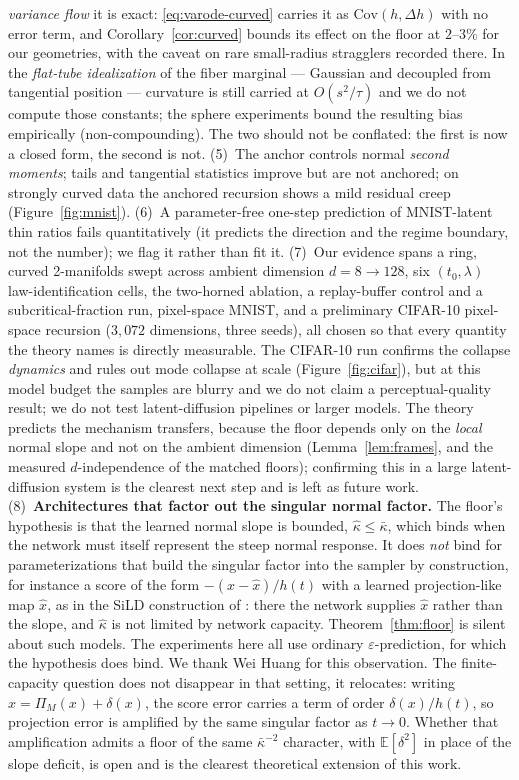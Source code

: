 \documentclass[11pt]{article}
\theoremstyle{remark}
\newcommand{\kb}{\bar\kappa}
\newcommand{\eps}{\varepsilon}
\newcommand{\E}{\mathbb{E}}
\newcommand{\Cov}{\mathrm{Cov}}
\begin{document}
\emph{variance flow} it is exact: \eqref{eq:varode-curved} carries it as $\Cov(h,\Delta h)$
with no error term, and Corollary~\ref{cor:curved} bounds its effect on the floor at
$2$--$3\%$ for our geometries, with the caveat on rare small-radius stragglers recorded
there. In the \emph{flat-tube idealization} of the fiber marginal --- Gaussian and decoupled
from tangential position --- curvature is still carried at $O(s^2/\tau)$ and we do not
compute those constants; the sphere experiments bound the resulting bias empirically
(non-compounding). The two should not be conflated: the first is now a closed form, the
second is not.
(5)~The anchor controls normal \emph{second moments}; tails and tangential statistics
improve but are not anchored; on strongly curved data the anchored recursion shows a
mild residual creep (Figure~\ref{fig:mnist}).
(6)~A parameter-free one-step prediction of MNIST-latent thin ratios fails
quantitatively (it predicts the direction and the regime boundary, not the number); we
flag it rather than fit it.
(7)~Our evidence spans a ring, curved 2-manifolds swept across ambient dimension
$d=8\to128$, six $(t_0,\lambda)$ law-identification cells, the two-horned ablation,
a replay-buffer control and a subcritical-fraction run,
pixel-space MNIST, and a preliminary CIFAR-10 pixel-space recursion ($3{,}072$ dimensions,
three seeds), all chosen so that every quantity the theory names is directly measurable. The
CIFAR-10 run confirms the collapse \emph{dynamics} and rules out mode collapse at scale
(Figure~\ref{fig:cifar}), but at this model budget the samples are blurry and we do not
claim a perceptual-quality result; we do not test latent-diffusion pipelines or
larger models. The theory predicts the mechanism transfers, because the floor depends only
on the \emph{local} normal slope and not on the ambient dimension (Lemma~\ref{lem:frames},
and the measured $d$-independence of the matched floors); confirming this in a large
latent-diffusion system is the clearest next step and is left as future work.
(8)~\textbf{Architectures that factor out the singular normal factor.} The floor's
hypothesis is that the learned normal slope is bounded, $\hat\kappa\le\kb$, which binds
when the network must itself represent the steep normal response. It does \emph{not} bind
for parameterizations that build the singular factor into the sampler by construction, for
instance a score of the form $-(x-\hat x)/h(t)$ with a learned projection-like map $\hat x$,
as in the SiLD construction of \citet{huang2026provable}: there the network supplies
$\hat x$ rather than the slope, and $\hat\kappa$ is not limited by network capacity.
Theorem~\ref{thm:floor} is silent about such models. The experiments here all use ordinary
$\eps$-prediction, for which the hypothesis does bind. We thank Wei Huang for this
observation. The finite-capacity question does not disappear in that setting, it relocates:
writing $\hat x=\Pi_M(x)+\delta(x)$, the score error carries a term of order
$\delta(x)/h(t)$, so projection error is amplified by the same singular factor as $t\to0$.
Whether that amplification admits a floor of the same $\kb^{-2}$ character, with
$\E[\delta^2]$ in place of the slope deficit, is open and is the clearest theoretical
extension of this work.
\end{document}
